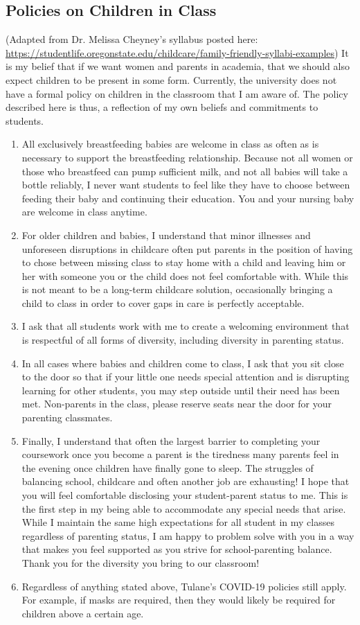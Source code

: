\documentclass[11pt,letterpaper,final]{article}
\begin{document}
\subsection{Policies on Children in Class}
(Adapted from Dr. Melissa Cheyney's syllabus posted here: \url{https://studentlife.oregonstate.edu/childcare/family-friendly-syllabi-examples}) It is my belief that if we want women and parents in academia, that we should also expect children to be present in some form. Currently, the university does not have a formal policy on children in the classroom that I am aware of. The policy described here is thus, a reflection of my own beliefs and commitments to students.
\begin{enumerate}
\item All exclusively breastfeeding babies are welcome in class as often as is necessary to support the breastfeeding relationship. Because not all women or those who breastfeed can pump sufficient milk, and not all babies will take a bottle reliably, I never want students to feel like they have to choose between feeding their baby and continuing their education. You and your nursing baby are welcome in class anytime.
\item For older children and babies, I understand that minor illnesses and unforeseen disruptions in childcare often put parents in the position of having to chose between missing class to stay home with a child and leaving him or her with someone you or the child does not feel comfortable with. While this is not meant to be a long-term childcare solution, occasionally bringing a child to class in order to cover gaps in care is perfectly acceptable.
\item I ask that all students work with me to create a welcoming environment that is respectful of all forms of diversity, including diversity in parenting status.
\item In all cases where babies and children come to class, I ask that you sit close to the door so that if your little one needs special attention and is disrupting learning for other students, you may step outside until their need has been met. Non-parents in the class, please reserve seats near the door for your parenting classmates.
\item Finally, I understand that often the largest barrier to completing your coursework once you become a parent is the tiredness many parents feel in the evening once children have finally gone to sleep. The struggles of balancing school, childcare and often another job are exhausting! I hope that you will feel comfortable disclosing your student-parent status to me. This is the first step in my being able to accommodate any special needs that arise. While I maintain the same high expectations for all student in my classes regardless of parenting status, I am happy to problem solve with you in a way that makes you feel supported as you strive for school-parenting balance. Thank you for the diversity you bring to our classroom! 
\item Regardless of anything stated above, Tulane's COVID-19 policies still apply. For example, if masks are required, then they would likely be required for children above a certain age.
\end{enumerate}
\end{document}
